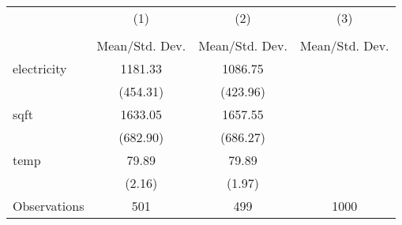 {
\def\sym#1{\ifmmode^{#1}\else\(^{#1}\)\fi}
\begin{tabular}{l*{3}{c}}
\hline\hline
                    &\multicolumn{1}{c}{(1)}&\multicolumn{1}{c}{(2)}&\multicolumn{1}{c}{(3)}\\
                    &\multicolumn{1}{c}{}&\multicolumn{1}{c}{}&\multicolumn{1}{c}{}\\
                    &Mean/Std. Dev.&Mean/Std. Dev.&Mean/Std. Dev.\\
\hline
electricity         &     1181.33&     1086.75&            \\
                    &    (454.31)&    (423.96)&            \\
sqft                &     1633.05&     1657.55&            \\
                    &    (682.90)&    (686.27)&            \\
temp                &       79.89&       79.89&            \\
                    &      (2.16)&      (1.97)&            \\
\hline
Observations        &         501&         499&        1000\\
\hline\hline
\end{tabular}
}
